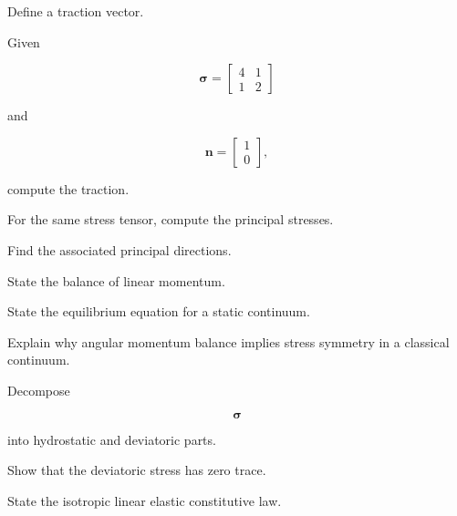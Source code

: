 \begin{exercise}[2]
Define a traction vector.
\end{exercise}

\begin{exercise}[2]
Given

\[
\boldsymbol{\sigma}
=
\begin{bmatrix}
4 & 1\\
1 & 2
\end{bmatrix}
\]

and

\[
\mathbf{n}
=
\begin{bmatrix}
1\\
0
\end{bmatrix},
\]

compute the traction.
\end{exercise}

\begin{exercise}[3]
For the same stress tensor, compute the principal stresses.
\end{exercise}

\begin{exercise}[3]
Find the associated principal directions.
\end{exercise}

\begin{exercise}[2]
State the balance of linear momentum.
\end{exercise}

\begin{exercise}[2]
State the equilibrium equation for a static continuum.
\end{exercise}

\begin{exercise}[3]
Explain why angular momentum balance implies stress symmetry in a classical
continuum.
\end{exercise}

\begin{exercise}[2]
Decompose

\[
\boldsymbol{\sigma}
\]

into hydrostatic and deviatoric parts.
\end{exercise}

\begin{exercise}[3]
Show that the deviatoric stress has zero trace.
\end{exercise}

\begin{exercise}[2]
State the isotropic linear elastic constitutive law.
\end{exercise}

